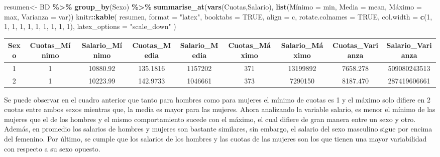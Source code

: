 \documentclass[
]{article}
\newenvironment{Shaded}{\begin{snugshade}}{\end{snugshade}}
\newcommand{\AttributeTok}[1]{\textcolor[rgb]{0.13,0.29,0.53}{#1}}
\newcommand{\ConstantTok}[1]{\textcolor[rgb]{0.56,0.35,0.01}{#1}}
\newcommand{\DecValTok}[1]{\textcolor[rgb]{0.00,0.00,0.81}{#1}}
\newcommand{\FunctionTok}[1]{\textcolor[rgb]{0.13,0.29,0.53}{\textbf{#1}}}
\newcommand{\NormalTok}[1]{#1}
\newcommand{\OtherTok}[1]{\textcolor[rgb]{0.56,0.35,0.01}{#1}}
\newcommand{\SpecialCharTok}[1]{\textcolor[rgb]{0.81,0.36,0.00}{\textbf{#1}}}
\newcommand{\StringTok}[1]{\textcolor[rgb]{0.31,0.60,0.02}{#1}}
\begin{document}
\begin{Shaded}
\begin{Highlighting}[]
\NormalTok{resumen}\OtherTok{\textless{}{-}}\NormalTok{ BD }\SpecialCharTok{\%\textgreater{}\%} \FunctionTok{group\_by}\NormalTok{(Sexo) }\SpecialCharTok{\%\textgreater{}\%} \FunctionTok{summarise\_at}\NormalTok{(}\FunctionTok{vars}\NormalTok{(Cuotas,Salario), }
                                                          \FunctionTok{list}\NormalTok{(Mínimo }\OtherTok{=}\NormalTok{ min,}
                                                          \AttributeTok{Media =}\NormalTok{ mean,}
\NormalTok{                                                          Máximo }\OtherTok{=}\NormalTok{ max,}
                                                          \AttributeTok{Varianza =}\NormalTok{ var))}
\NormalTok{knitr}\SpecialCharTok{::}\FunctionTok{kable}\NormalTok{(}
\NormalTok{  resumen,}
  \AttributeTok{format =} \StringTok{"latex"}\NormalTok{,}
  \AttributeTok{booktabs =} \ConstantTok{TRUE}\NormalTok{,}
  \AttributeTok{align =} \StringTok{\textquotesingle{}c\textquotesingle{}}\NormalTok{,}
  \AttributeTok{rotate.colnames =} \ConstantTok{TRUE}\NormalTok{,}
  \AttributeTok{col.width =} \FunctionTok{c}\NormalTok{(}\DecValTok{1}\NormalTok{, }\DecValTok{1}\NormalTok{, }\DecValTok{1}\NormalTok{, }\DecValTok{1}\NormalTok{, }\DecValTok{1}\NormalTok{, }\DecValTok{1}\NormalTok{, }\DecValTok{1}\NormalTok{, }\DecValTok{1}\NormalTok{, }\DecValTok{1}\NormalTok{, }\DecValTok{1}\NormalTok{),}
  \AttributeTok{latex\_options =} \StringTok{"scale\_down"}
\NormalTok{)}
\end{Highlighting}
\end{Shaded}

\begin{tabular}{ccccccccc}
\toprule
Sexo & Cuotas\_Mínimo & Salario\_Mínimo & Cuotas\_Media & Salario\_Media & Cuotas\_Máximo & Salario\_Máximo & Cuotas\_Varianza & Salario\_Varianza\\
\midrule
1 & 1 & 10880.92 & 135.1816 & 1157202 & 371 & 13199892 & 7658.278 & 509080243513\\
2 & 1 & 10223.99 & 142.9733 & 1046661 & 373 & 7290150 & 8187.470 & 287419606661\\
\bottomrule
\end{tabular}

Se puede observar en el cuadro anterior que tanto para hombres como para
mujeres el mínimo de cuotas es 1 y el máximo solo difiere en 2 cuotas
entre ambos sexos mientras que, la media es mayor para las mujeres.
Ahora analizando la variable salario, es menor el mínimo de las mujeres
que el de los hombres y el mismo comportamiento sucede con el máximo, el
cual difiere de gran manera entre un sexo y otro. Además, en promedio
los salarios de hombres y mujeres son bastante similares, sin embargo,
el salario del sexo masculino sigue por encima del femenino. Por último,
se cumple que los salarios de los hombres y las cuotas de las mujeres
son los que tienen una mayor variabilidad con respecto a su sexo
opuesto.
\end{document}
